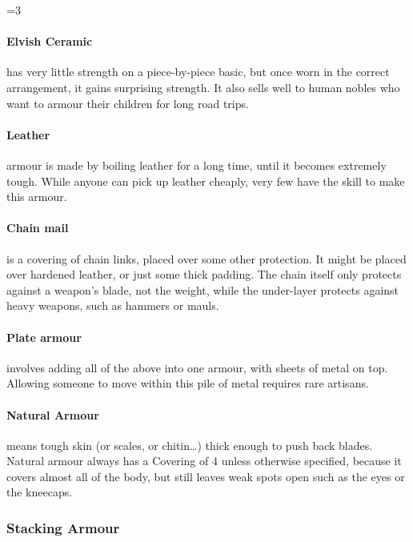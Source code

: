 \begin{multicols}{2}
\ifnum\value{r4}=3
  \paragraph{Elvish Ceramic}
  has very little strength on a piece-by-piece basic, but once worn in the correct arrangement, it gains surprising strength.
  It also sells well to human nobles who want to armour their children for long road trips. 
\fi

\paragraph{Leather}
armour is made by boiling leather for a long time, until it becomes extremely tough.
While anyone can pick up leather cheaply, very few have the skill to make this armour.

\paragraph{Chain mail}
is a covering of chain links, placed over some other protection.
It might be placed over hardened leather, or just some thick padding.
The chain itself only protects against a weapon's blade, not the weight, while the under-layer protects against heavy weapons, such as hammers or mauls.

\paragraph{Plate armour}
involves adding all of the above into one armour, with sheets of metal on top.
Allowing someone to move within this pile of metal requires rare artisans.


\paragraph{Natural Armour}
means tough skin (or scales, or chitin\ldots) thick enough to push back blades.
Natural armour always has a Covering of 4 unless otherwise specified, because it covers almost all of the body, but still leaves weak spots open such as the eyes or the kneecaps.

\begin{figure*}[t!]
\projectilesChart
\end{figure*}

\subsubsection{Stacking Armour}
\label{stackingarmour}


\end{multicols}
